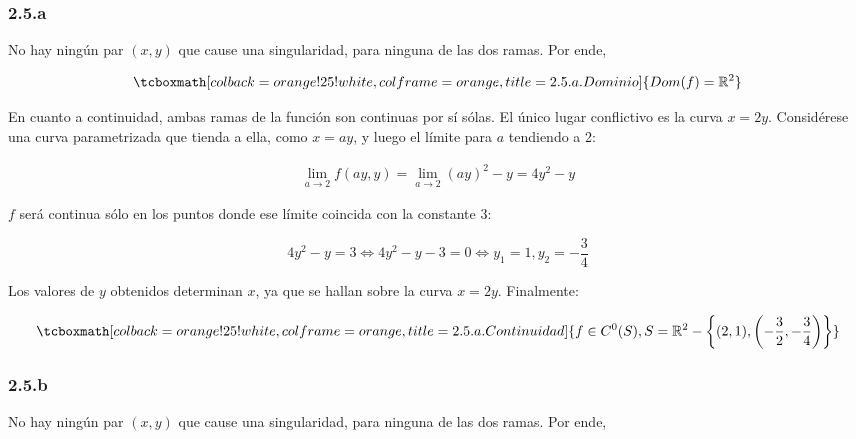 \documentclass{article}
\renewcommand{\Bbb}{\mathbb}
\begin{document}
\subsubsection*{2.5.a}
\label{subsubsec:2.5.a}

No hay ningún par $(x,y)$ que cause una singularidad, para ninguna de las dos ramas. Por ende,

\begin{equation}
\tcboxmath[colback=orange!25!white,colframe=orange,title=2.5.a. Dominio ]
{ \mathop{Dom}(f) = \Bbb R^2 }
\end{equation}

En cuanto a continuidad, ambas ramas de la función son continuas por sí sólas. El único lugar conflictivo es la curva $x = 2y$. Considérese una curva parametrizada que tienda a ella, como $x = ay$, y luego el límite para $a$ tendiendo a 2:

\begin{subequations}
\begin{align}
\lim_{a \rightarrow 2} f(ay, y) = \lim_{a \rightarrow 2} (ay)^2 - y = 4y^2 - y
\end{align}
\end{subequations}

$f$ será continua sólo en los puntos donde ese límite coincida con la constante $3$:

\begin{equation}
4y^2 - y = 3 \Leftrightarrow 4y^2 - y - 3 = 0 \Leftrightarrow y_1 = 1, y_2 = -\frac{3}{4}
\end{equation}

Los valores de $y$ obtenidos determinan $x$, ya que se hallan sobre la curva $x = 2y$. Finalmente:

\begin{equation}
\tcboxmath[colback=orange!25!white,colframe=orange,title=2.5.a. Continuidad ]
{ f \in C^0(S), S = \Bbb R^2 - \left\{ (2, 1), \left(-\frac{3}{2}, -\frac{3}{4} \right) \right\} }
\end{equation}

\subsubsection*{2.5.b}
\label{subsubsec:2.5.b}

No hay ningún par $(x,y)$ que cause una singularidad, para ninguna de las dos ramas. Por ende,
\end{document}
